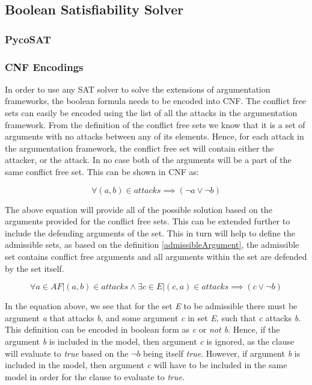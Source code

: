 \subsection{Boolean Satisfiability Solver} \label{section:satSolver}


\subsubsection{PycoSAT}


\subsubsection{CNF Encodings}
In order to use any SAT solver to solve the extensions of argumentation frameworks, the boolean formula needs to be encoded into CNF. The conflict free sets can easily be encoded using the list of all the attacks in the argumentation framework. From the definition of the conflict free sets we know that it is a set of arguments with no attacks between any of its elements. Hence, for each attack in the argumentation framework, the conflict free set will contain either the attacker, or the attack. In no case both of the arguments will be a part of the same conflict free set. This can be shown in CNF as:

\begin{equation}
	  \forall (a,b) \in attacks \implies (\neg a \lor \neg b)
\end{equation}

The above equation will provide all of the possible solution based on the arguments provided for the conflict free sets. This can be extended further to include the defending arguments of the set. This in turn will help to define the admissible sets, as based on the definition \ref{admissibleArgument}, the admissible set contains conflict free arguments and all arguments within the set are defended by the set itself.

\begin{equation}
\forall a \in AF | (a,b) \in attacks \land \exists c \in E | (c,a) \in attacks \implies (c \lor \neg b)
\end{equation}

In the equation above, we see that for the set \textit{E} to be admissible there must be argument \textit{a} that attacks \textit{b}, and some argument \textit{c} in set \textit{E}, such that \textit{c} attacks \textit{b}. This definition can be encoded in boolean form as \textit{c} or \textit{not b}. Hence, if the argument \textit{b} is included in the model, then argument \textit{c} is ignored, as the clause will evaluate to \textit{true} based on the $\neg b$ being itself \textit{true}. However, if argument \textit{b} is included in the model, then argument \textit{c} will have to be included in the same model in order for the clause to evaluate to \textit{true}.